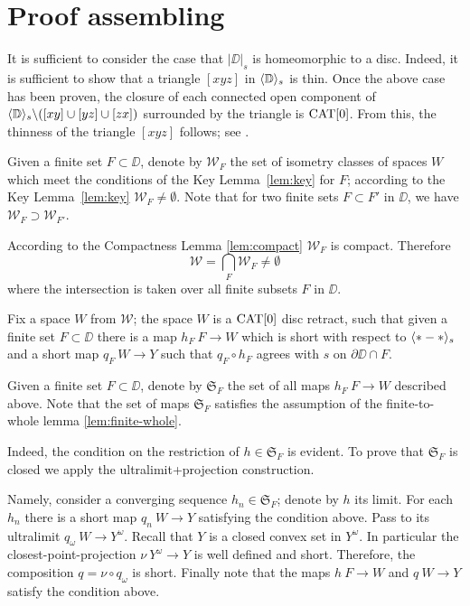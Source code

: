 \section{Proof assembling}\label{Main theorem}



It is sufficient to consider
the case that $|\DD|_s$ is  homeomorphic to a disc.
Indeed, it is sufficient to show that a triangle $[xyz]$ in $\langle\mathbb{D}\rangle_s$ is thin. 
Once the above case has been proven, the closure of each connected open component of $\langle\mathbb{D}\rangle_s\backslash ([xy]\cup[yz]\cup[zx])$
surrounded by the triangle is $\mathop{\rm CAT}\nolimits[0]$.
From this, the thinness of the triangle $[xyz]$ follows; see \cite{bishop}.


Given a finite set $F\subset \DD$,
denote by $\mathcal{W}_F$
the set of isometry classes of spaces $W$ which meet the conditions of the Key Lemma~\ref{lem:key}
for $F$;
according to the Key Lemma~\ref{lem:key} $\mathcal{W}_F\ne\emptyset$.
Note that for two finite sets $F\subset F'$ in $\DD$,
we have $\mathcal{W}_F\supset \mathcal{W}_{F'}$.

According to the Compactness Lemma \ref{lem:compact} $\mathcal{W}_F$ is compact.
Therefore 
\[\mathcal{W}
=
\bigcap_{F}\mathcal{W}_F\ne \emptyset\]
where the intersection is taken over all finite subsets $F$ in $\DD$. 


Fix a space $W$ from $\mathcal{W}$;
the space $W$ is a $\mathop{\rm CAT}\nolimits[0]$ disc retract,
such that given a finite set $F\subset \DD$ there is a map $h_F\:F\to W$ which is short with 
respect to $\langle{*}-{*}\rangle_s$ 
and a short map $q_F\:W\to Y$ such that $q_F\circ h_F$ agrees with $s$ on $\partial\DD\cap F$.

Given a finite set $F\subset \DD$,
denote by $\mathfrak{S}_F$ the set of all maps $h_F\:F\to W$ described above.
Note that the set of maps $\mathfrak{S}_F$ satisfies the assumption of the finite-to-whole lemma \ref{lem:finite-whole}.

Indeed, the condition on the restriction of $h\in  \mathfrak{S}_F$ is evident.
To prove that $\mathfrak{S}_F$ is closed we apply the ultralimit+projection construction.

Namely, consider a converging sequence $h_n\in  \mathfrak{S}_F$;
denote by $h$ its limit.
For each $h_n$ there is a short map $q_n\:W\to Y$ satisfying the condition above.
Pass to its ultralimit $q_\omega\:W\to Y^\omega$.
Recall that $Y$ is a closed convex set in $Y^\omega$.
In particular the closest-point-projection $\nu\:Y^\omega\to Y$ is well defined and short.
Therefore, the composition $q=\nu\circ q_\omega$ is short.
Finally note that the maps $h\:F\to W$ and $q\:W\to Y$ satisfy the condition above.

